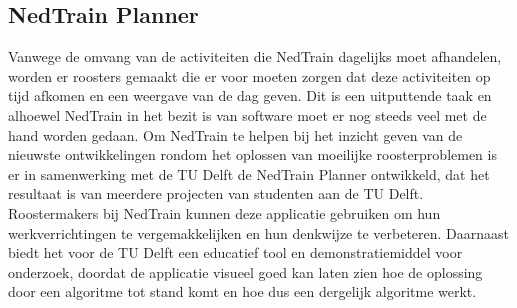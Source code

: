 \subsection{NedTrain Planner}
Vanwege de omvang van de activiteiten die NedTrain dagelijks moet afhandelen, worden er roosters gemaakt die er voor moeten zorgen dat deze activiteiten op tijd afkomen en een weergave van de dag geven. Dit is een uitputtende taak en alhoewel NedTrain in het bezit is van software moet er nog steeds veel met de hand worden gedaan. Om NedTrain te helpen bij het inzicht geven van de nieuwste ontwikkelingen rondom het oplossen van moeilijke roosterproblemen is er in samenwerking met de TU Delft de NedTrain Planner ontwikkeld, dat het resultaat is van meerdere projecten van studenten aan de TU Delft. Roostermakers bij NedTrain kunnen deze applicatie gebruiken om hun werkverrichtingen te vergemakkelijken en hun denkwijze te verbeteren. Daarnaast biedt het voor de TU Delft een educatief tool en demonstratiemiddel voor onderzoek, doordat de applicatie visueel goed kan laten zien hoe de oplossing door een algoritme tot stand komt en hoe dus een dergelijk algoritme werkt.